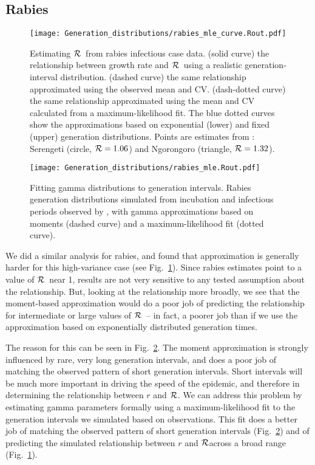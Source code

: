 \documentclass[12pt,]{article}
\newcommand{\RR}{\ensuremath{{\cal R}}}
\newcommand{\fref}[1]{Fig.~\ref{fig:#1}}
\begin{document}
\subsection{Rabies}

\begin{figure}[htbp] \centering
	\texttt{[image: Generation\_distributions/rabies\_mle\_curve.Rout.pdf]}
	\caption{Estimating \RR~from rabies infectious case data.
		(solid curve) the relationship between growth rate and \RR~using a realistic generation-interval distribution.
		(dashed curve) the same relationship approximated using the observed mean and CV.
		(dash-dotted curve) the same relationship approximated using the mean and CV calculated from a maximum-likelihood fit.
		The blue dotted curves show the approximations based on exponential (lower) and fixed (upper) generation distributions.
		Points are estimates from \cite{HampDush09}:
		Serengeti (circle, $\RR=1.06$) and Ngorongoro (triangle, $\RR=1.32$).
	}
	\label{fig:rabiesCurve}
\end{figure}

\begin{figure}[htbp] \centering
	\texttt{[image: Generation\_distributions/rabies\_mle.Rout.pdf]}
	\caption{
		Fitting gamma distributions to generation intervals. 
		Rabies generation distributions simulated from incubation and infectious periods observed by \cite{HampDush09}, with gamma approximations based on moments (dashed curve) and a maximum-likelihood fit (dotted curve).
	}
	\label{fig:rabiesHist}
\end{figure}

We did a similar analysis for rabies, and found that approximation is generally harder for this high-variance case (see \fref{rabiesCurve}). Since rabies estimates point to a value of \RR\ near 1, results are not very sensitive to any tested assumption about the relationship. But, looking at the relationship more broadly, we see that the moment-based approximation would do a poor job of predicting the relationship for intermediate or large values of \RR\ -- in fact, a poorer job than if we use the approximation based on exponentially distributed generation times. 

The reason for this can be seen in \fref{rabiesHist}. The moment approximation is strongly influenced by rare, very long generation intervals, and does a poor job of matching the observed pattern of short generation intervals. Short intervals will be much more important in driving the speed of the epidemic, and therefore in determining the relationship between $r$ and \RR. We can address this problem by estimating gamma parameters formally using a maximum-likelihood fit to the generation intervals we simulated based on observations. This fit does a better job of matching the observed pattern of short generation intervals (\fref{rabiesHist}) and of predicting the simulated relationship between $r$ and \RR across a broad range (\fref{rabiesCurve}).
\end{document}
